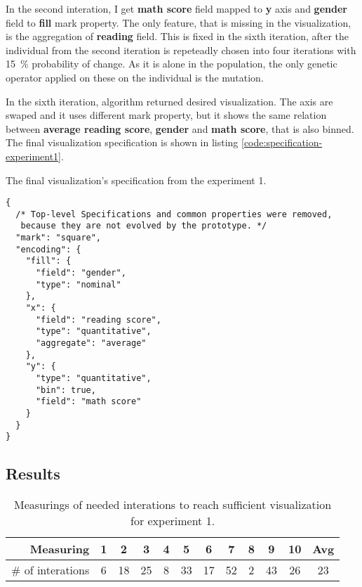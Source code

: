 In the second interation, I get \textbf{math score} field mapped to \textbf{y} axis and \textbf{gender} field to \textbf{fill} mark property. The only feature, that is missing in the visualization, is the aggregation of \textbf{reading} field. This is fixed in the sixth iteration, after the individual from the second iteration is repeteadly chosen into four iterations with 15~\% probability of change. As it is alone in the population, the only genetic operator applied on these on the individual is the mutation.

In the sixth iteration, algorithm returned desired visualization. The axis are swaped and it uses different mark property, but it shows the same relation between \textbf{average reading score}, \textbf{gender} and \textbf{math score}, that is also binned. The final visualization specification is shown in listing \ref{code:specification-experiment1}.


\begin{listing}[htbp]
\caption{\label{code:specification-experiment1}The final visualization's specification from the experiment 1.}
\begin{verbatim}
{
  /* Top-level Specifications and common properties were removed,
   because they are not evolved by the prototype. */
  "mark": "square",
  "encoding": {
    "fill": {
      "field": "gender",
      "type": "nominal"
    },
    "x": {
      "field": "reading score",
      "type": "quantitative",
      "aggregate": "average"
    },
    "y": {
      "type": "quantitative",
      "bin": true,
      "field": "math score"
    }
  }
}
\end{verbatim}
\end{listing}
\clearpage
\subsection{Results}
\begin{table}[htbp]
      \centering
      \caption{Measurings of needed interations to reach sufficient visualization for experiment 1.}
      \label{table:results}
          \begin{tabular}{ r | c c c c c c c c c c | c }
          \hline
              \textbf{Measuring} & \textbf{1} & \textbf{2} & \textbf{3} & \textbf{4} & \textbf{5} & \textbf{6} & \textbf{7} & \textbf{8} & \textbf{9} & \textbf{10} & \textbf{Avg} \\
          \toprule
\hline \# of interations & 6 & 18 & 25 & 8 & 33 & 17 & 52 & 2 & 43 & 26 & 23  \\ \hline
          \end{tabular}
\end{table}

